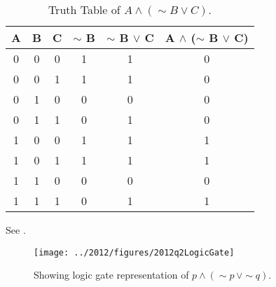 \begin{subquestions}
\begin{subsubquestions}
\begin{table}[ht]
	\centering
	\begin{tabular}{|c|c|c|c|c|c|}
		\hline
		A & B & C & $\sim$ B & $\sim$ B $\lor$ C & A $\land$ ($\sim$ B $\lor$ C) \\
		\hline
		0 & 0 & 0 & 1 & 1 & 0 \\
		0 & 0 & 1 & 1 & 1 & 0 \\
		0 & 1 & 0 & 0 & 0 & 0 \\
		0 & 1 & 1 & 0 & 1 & 0 \\
		1 & 0 & 0 & 1 & 1 & 1 \\
		1 & 0 & 1 & 1 & 1 & 1 \\
		1 & 1 & 0 & 0 & 0 & 0 \\
		1 & 1 & 1 & 0 & 1 & 1 \\
		\hline
	\end{tabular}
	\caption{\label{2012:q2:TruthTab3} Truth Table of $A \land (\sim B \lor C)$.}
\end{table}

\end{subsubquestions}


\subquestion

See .

\begin{figure}
	\begin{center}
		\texttt{[image: ../2012/figures/2012q2LogicGate]}
		\caption{\label{2012:q2:LogicGate} Showing logic gate representation of $p \land (\sim p \, \lor \sim q)$.}
	\end{center}
\end{figure}


\end{subquestions}
